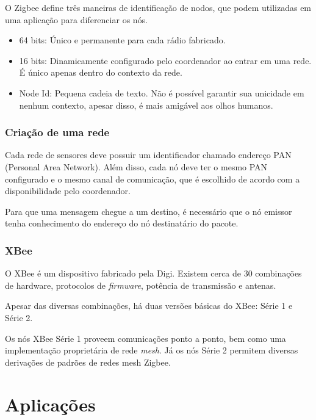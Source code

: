 \documentclass[
	article,			%
	11pt,				%
	oneside,			%
	a4paper,			%
	section=TITLE,		%
	subsection=TITLE,	%
	english,			%
	brazil,				%
	sumario=tradicional
	]{abntex2}
\begin{document}

O Zigbee define três maneiras de identificação de nodos, que podem utilizadas em uma aplicação para 
diferenciar os nós.

\begin{itemize} \parskip -4pt
	\item 64 bits: Único e permanente para cada rádio fabricado.
	\item 16 bits: Dinamicamente configurado pelo coordenador ao entrar em uma rede. É único apenas 
	dentro do contexto da rede.
	\item Node Id: Pequena cadeia de texto. Não é possível garantir sua unicidade em nenhum 
	contexto, apesar disso, é mais amigável aos olhos humanos.
\end{itemize}

\subsubsection{Criação de uma rede}

Cada rede de sensores deve possuir um identificador chamado endereço PAN (Personal Area Network). 
Além disso, cada nó deve ter o mesmo PAN configurado e o mesmo canal de comunicação, que é 
escolhido de acordo com a disponibilidade pelo coordenador. 

Para que uma mensagem chegue a um destino, é necessário que o nó emissor tenha conhecimento do 
endereço do nó destinatário do pacote.


\subsubsection{XBee}

O XBee é um dispositivo fabricado pela Digi. Existem cerca de 
30 combinações de hardware, protocolos de \textit{firmware}, potência de transmissão e antenas.

Apesar das diversas combinações, há duas versões básicas do XBee: Série 1 e Série 2.

Os nós XBee Série 1 proveem comunicações ponto a ponto, bem como uma implementação proprietária de 
rede \textit{mesh}. Já os nós Série 2 permitem diversas derivações de padrões de redes mesh Zigbee.

\section{Aplicações}
\end{document}
